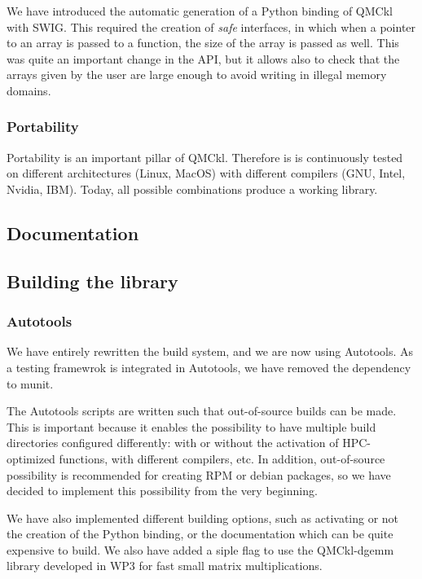 We have introduced the automatic generation of a Python binding of
QMCkl with SWIG. This required the creation of \emph{safe} interfaces,
in which when a pointer to an array is passed to a function, the size
of the array is passed as well. This was quite an important change in
the API, but it allows also to check that the arrays given by the user
are large enough to avoid writing in illegal memory domains.

\subsubsection{Portability}

Portability is an important pillar of QMCkl. Therefore is is
continuously tested on different architectures (Linux, MacOS) with
different compilers (GNU, Intel, Nvidia, IBM). Today, all possible
combinations produce a working library.


\subsection{Documentation}

\subsection{Building the library}

\subsubsection{Autotools}

We have entirely rewritten the build system, and we are now using
Autotools. As a testing framewrok is integrated in Autotools, we have
removed the dependency to munit.

The Autotools scripts are written such that out-of-source builds can
be made. This is important because it enables the possibility to have
multiple build directories configured differently: with or without the
activation of HPC-optimized functions, with different compilers, etc.
In addition, out-of-source possibility is recommended for creating RPM
or debian packages, so we have decided to implement this possibility
from the very beginning.

We have also implemented different building options, such as
activating or not the creation of the Python binding, or the
documentation which can be quite expensive to build. We also have
added a siple flag to use the QMCkl-dgemm library developed in WP3 for
fast small matrix multiplications.

